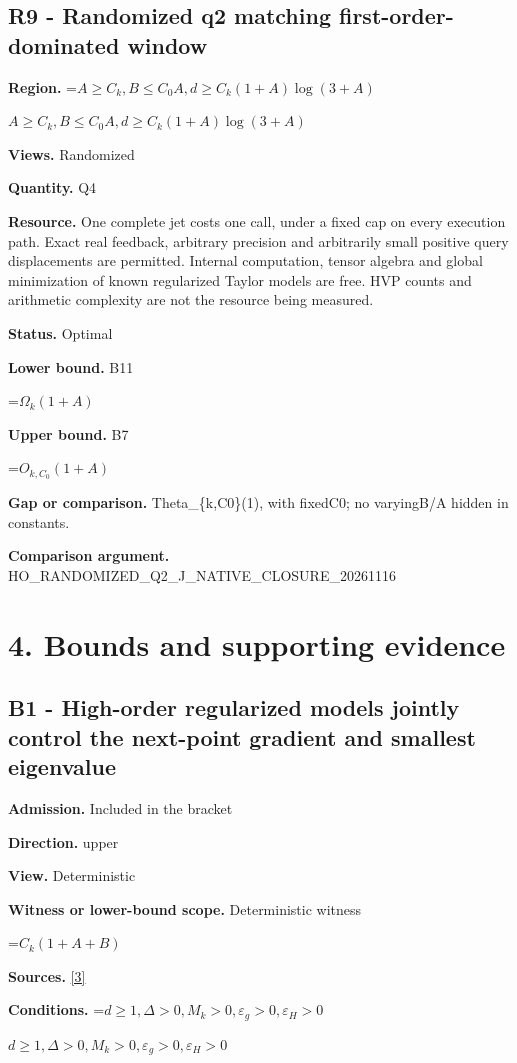 \documentclass[10pt,a4paper]{article}
\newcommand{\AtlasMath}[1]{\par\begingroup\centering\setbox0=\hbox{$\displaystyle #1$}\ifdim\wd0>1.4\linewidth\typeout{ATLAS WIDE FORMULA: \the\wd0}\fi\ifdim\wd0>\linewidth\resizebox{\linewidth}{!}{\box0}\else\box0\fi\par\endgroup}
\newcommand{\AtlasInlineMath}[1]{\begingroup\setbox0=\hbox{$#1$}\ifdim\wd0>.4\linewidth\endgroup\AtlasMath{#1}\else\endgroup$#1$\fi}
\begin{document}
\subsection{R9 - Randomized q2 matching first-order-dominated window}
\textbf{Region.} \AtlasInlineMath{A\ge C_k,B\le C_0 A,d\ge C_k(1+A)\log(3+A)}

\textbf{Views.} Randomized

\textbf{Quantity.} Q4

\textbf{Resource.} One complete jet costs one call, under a fixed cap on every execution path. Exact real feedback, arbitrary precision and arbitrarily small positive query displacements are permitted. Internal computation, tensor algebra and global minimization of known regularized Taylor models are free. HVP counts and arithmetic complexity are not the resource being measured.

\textbf{Status.} Optimal

\textbf{Lower bound.} B11

\AtlasMath{\Omega_k(1+A)}
\textbf{Upper bound.} B7

\AtlasMath{O_{k,C_0}(1+A)}
\textbf{Gap or comparison.} Theta\_\allowbreak{}\{k,C0\}(1), with fixedC0; no varyingB/A hidden in constants.

\textbf{Comparison argument.} HO\_\allowbreak{}RANDOMIZED\_\allowbreak{}Q2\_\allowbreak{}J\_\allowbreak{}NATIVE\_\allowbreak{}CLOSURE\_\allowbreak{}20261116

\section{4. Bounds and supporting evidence}
\subsection{B1 - High-order regularized models jointly control the next-point gradient and smallest eigenvalue}
\textbf{Admission.} Included in the bracket

\textbf{Direction.} upper

\textbf{View.} Deterministic

\textbf{Witness or lower-bound scope.} Deterministic witness

\AtlasMath{C_k(1+A+B)}
\textbf{Sources.} \href{https://arxiv.org/abs/1708.04044}{[3]}

\textbf{Conditions.} \AtlasInlineMath{d\ge 1,\Delta>0,M_k>0,\varepsilon_g>0,\varepsilon_H>0}
\end{document}
